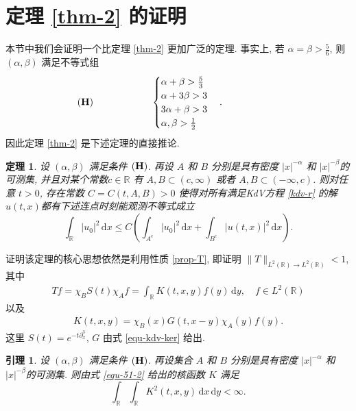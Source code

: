 \documentclass[master]{cugthesis}
\newcommand\R{\ensuremath{\mathbb{R}}}
\renewcommand\d{\ensuremath{\,\mathrm{d}}}
\newtheorem{theorem}{定理}[chapter]
\newtheorem{lemma}{引理}[chapter]
\begin{document}
    \section{定理 \ref{thm-2} 的证明}
    本节中我们会证明一个比定理 \ref{thm-2} 更加广泛的定理. 事实上, 若 $\alpha=\beta>\frac{5}{6}$, 则 $(\alpha,\beta)$ 满足不等式组
$$
  ({\bf H}) \qquad   \qquad \qquad   \begin{cases}
          \alpha+\beta>\frac{5}{3}&\\
          \alpha+3\beta>3&\\
          3\alpha+\beta>3&\\
          \alpha,\beta>\frac{1}{2}&
       \end{cases}.
        \qquad \qquad \qquad
$$
因此定理 \ref{thm-2} 是下述定理的直接推论.

\begin{theorem}\label{thm-4}
设 $(\alpha,\beta)$ 满足条件 $({\bf H})$. 再设  $A$ 和 $B$ 分别是具有密度 $|x|^{-\alpha}$ 和 $|x|^{-\beta}$的可测集, 并且对某个常数$c\in \R$ 有  $A,B\subset (c,\infty)$ 或者 $A,B\subset (-\infty,c)$. 则对任意 $t>0$, 存在常数 $C=C(t,A,B)>0$ 使得对所有满足KdV方程 \eqref{kdv-r} 的解$u(t,x)$都有下述连点时刻能观测不等式成立
$$
    \int_\R |u_0|^2\d x \leq C\left( \int_{A^c}|u_0|^2\d x + \int_{B^c}|u(t,x)|^2\d x \right).
$$
\end{theorem}

证明该定理的核心思想依然是利用性质 \ref{prop-T}, 即证明 $\|T\|_{L^2(\R)\to L^2(\R)}<1$, 其中
\begin{align}\label{equ-51-1}
Tf=\chi_BS(t)\chi_A f = \int_\R K(t,x,y)f(y)\d y, \quad f\in L^2(\R)
\end{align}
以及
\begin{align}\label{equ-51-2}
K(t,x,y)=\chi_B(x)G(t,x-y)\chi_A(y)f(y).
\end{align}
这里 $S(t)=e^{-t\partial_x^3}$, $G$ 由式 \eqref{equ-kdv-ker} 给出.

\begin{lemma}\label{lem-comp-2}
设 $(\alpha,\beta)$ 满足条件 $({\bf H})$. 再设集合  $A$ 和 $B$ 分别是具有密度 $|x|^{-\alpha}$ 和 $|x|^{-\beta}$的可测集. 则由式 \eqref{equ-51-2} 给出的核函数 $K$ 满足
    $$
       \int_{\mathbb{R}}\int_{\mathbb{R}}K^2(t,x,y)\d x\d y<\infty.
    $$
 \end{lemma}
\end{document}
